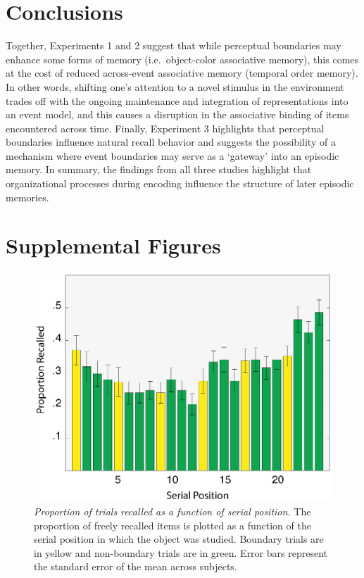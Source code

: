 \section{Conclusions}\label{conclusions}

Together, Experiments 1 and 2 suggest that while perceptual boundaries
may enhance some forms of memory (i.e.~object-color associative memory),
this comes at the cost of reduced across-event associative memory
(temporal order memory). In other words, shifting one's attention to a
novel stimulus in the environment trades off with the ongoing
maintenance and integration of representations into an event model, and
this causes a disruption in the associative binding of items encountered
across time. Finally, Experiment 3 highlights that perceptual boundaries
influence natural recall behavior and suggests the possibility of a
mechanism where event boundaries may serve as a `gateway' into an
episodic memory. In summary, the findings from all three studies
highlight that organizational processes during encoding influence the
structure of later episodic memories.

\section{Supplemental Figures}\label{supplemental-figures}

\begin{figure}
  \centering
  \includegraphics[width=\textwidth]{figures/chapter1_suppfigure1.eps}
  \caption[Behavioral experiment 3: Proportion of trials recalled by serial position]{\textit{Proportion of trials recalled as a function of serial position.} The proportion of freely recalled items is plotted as a function of the serial position in which the object was studied.  Boundary trials are in yellow and non-boundary trials are in green.  Error bars represent the standard error of the mean across subjects.}
  \label{chapter1_suppfigure1}
\end{figure}

